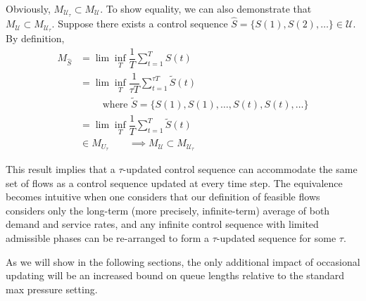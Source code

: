 Obviously, $M_{\mathcal U_\tau}  \subset M_{\mathcal U}$. To show equality, we can also demonstrate that $M_{\mathcal U}  \subset M_{\mathcal {U}_\tau} $. Suppose there exists a control sequence $\hat{S} = \{ S(1), S(2), \ldots \} \in \mathcal{U}$. 
By definition, 
\vspace{-1em}
\begin{align*}
M_{\hat{S}} &= \lim\inf_{T} \dfrac{1}{T}\sum_{t=1}^{T} S(t)\\&= \lim\inf_{T} \dfrac{1}{\tau T}\sum_{t=1}^{\tau T}  \tilde{S}(t) \; \\ 
& \qquad \text{ where } \tilde{S} = \{S(1), S(1), \ldots, S(t), S(t), \ldots \} \\
&= \lim\inf_{T} \dfrac{1}{ T}\sum_{t=1}^{T}  \tilde{S}(t) \\
& \in M_{U_\tau}  \qquad \implies M_{\mathcal U}  \subset M_{\mathcal {U}_\tau}
\end{align*}

This result implies that a $\tau$-updated control sequence can accommodate the same set of flows as a control sequence updated at every time step. The equivalence becomes intuitive when one considers that our definition of feasible flows considers only the long-term (more precisely, infinite-term) average of both demand and service rates, and any infinite control sequence with limited admissible phases can be re-arranged to form a $\tau$-updated sequence for some $\tau$. 

As we will show in the following sections, the only additional impact of occasional updating will be an increased bound on queue lengths relative to the standard max pressure setting.




